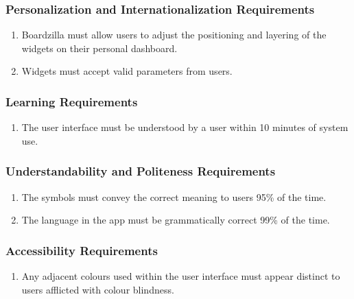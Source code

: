 \documentclass[]{article}
\begin{document}
	\subsubsection{Personalization and Internationalization Requirements}
	\label{ssub:personalization_and_internationalization_requirements}
	\begin{enumerate}[{UH}1. ]
		\item Boardzilla must allow users to adjust the positioning and layering of the widgets on their personal dashboard.
		\item Widgets must accept valid parameters from users.
	\end{enumerate}
	
	\subsubsection{Learning Requirements}
	\label{ssub:learning_requirements}
	\begin{enumerate}[{UH}1. ]
		\item The user interface must be understood by a user within 10 minutes of system use.
	\end{enumerate}
	
	\subsubsection{Understandability and Politeness Requirements}
	\label{ssub:understandability_and_politeness_requirements}
	\begin{enumerate}[{UH}1. ]
		\item The symbols must convey the correct meaning to users 95\% of the time.
		\item The language in the app must be grammatically correct 99\% of the time.
	\end{enumerate}
	
	\subsubsection{Accessibility Requirements}
	\label{ssub:accessibility_requirements}
	\begin{enumerate}[{UH}1.]
		\item Any adjacent colours used within the user interface must appear distinct to users afflicted with colour blindness.
	\end{enumerate}
	
\end{document}
